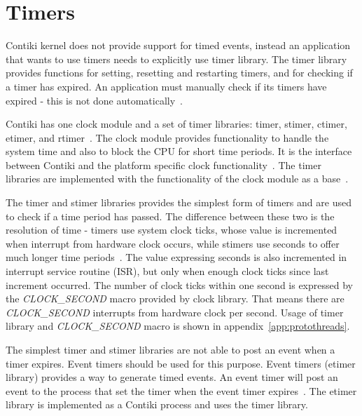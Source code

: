 
\section{Timers}\label{sec:contiki-timers}
Contiki kernel does not provide support for timed events,
instead an application that wants to use timers needs to explicitly use timer library.
The timer library provides functions for setting, resetting and restarting timers,
and for checking if a timer has expired.
An application must manually check if its timers have expired - this is not done automatically~\cite{contiki-docs}.

Contiki has one clock module and a set of timer libraries: timer, stimer, ctimer, etimer, and rtimer~\cite{contiki-wiki-timers}.
The clock module provides functionality to handle the system time and also to block the CPU for short time periods.
It is the interface between Contiki and the platform specific clock functionality~\cite{contiki-docs}.
The timer libraries are implemented with the functionality of the clock module as a base~\cite{contiki-wiki-timers}.

The timer and stimer libraries provides the simplest form of timers and are used to check if a time period has passed.
The difference between these two is the resolution of time -
timers use system clock ticks, whose value is incremented when interrupt from hardware clock occurs,
while stimers use seconds to offer much longer time periods~\cite{contiki-wiki-timers}.
The value expressing seconds is also incremented in interrupt service routine (ISR),
but only when enough clock ticks since last increment occurred.
The number of clock ticks within one second is expressed by the
{\it{CLOCK\_SECOND}} macro provided by clock library.
That means there are {\it{CLOCK\_SECOND}} interrupts from hardware clock per second.
Usage of timer library and {\it{CLOCK\_SECOND}} macro is shown in appendix~\ref{app:protothreads}.

The simplest timer and stimer libraries are not able to post an event when a timer expires.
Event timers should be used for this purpose.
Event timers (etimer library) provides a way to generate timed events.
An event timer will post an event to the process that set the timer when the
event timer expires~\cite{contiki-docs}.
The etimer library is implemented as a Contiki process and uses the timer library.

